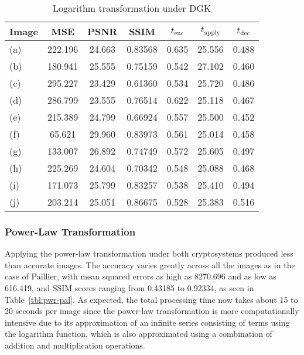 \begin{table}[h]
	\caption{Logarithm transformation under DGK}
	\label{tbl:log-dgk}
    \begin{tabular}{lcccccc}
        \toprule
        Image & MSE  & PSNR & SSIM & $t_\text{enc}$ & $t_\text{apply}$ & $t_\text{dec}$ \\ \midrule
		(a) & 222.196 & 24.663 & 0.83568 & 0.635 & 25.556 & 0.488 \\
		(b) & 180.941 & 25.555 & 0.75159 & 0.542 & 27.102 & 0.460 \\
		(c) & 295.227 & 23.429 & 0.61360 & 0.534 & 25.720 & 0.486 \\
		(d) & 286.799 & 23.555 & 0.76514 & 0.622 & 25.118 & 0.467 \\
		(e) & 215.389 & 24.799 & 0.66924 & 0.557 & 25.500 & 0.452 \\
		(f) & 65.621 & 29.960 & 0.83973 & 0.561 & 25.014 & 0.458 \\
		(g) & 133.007 & 26.892 & 0.74749 & 0.572 & 25.605 & 0.497 \\
		(h) & 225.269 & 24.604 & 0.70342 & 0.548 & 25.088 & 0.468 \\
		(i) & 171.073 & 25.799 & 0.83257 & 0.538 & 25.410 & 0.494 \\
		(j) & 203.214 & 25.051 & 0.86675 & 0.528 & 25.383 & 0.516 \\
		\bottomrule
    \end{tabular}
\end{table}

\subsubsection{Power-Law Transformation}
Applying the power-law transformation under both cryptosystems produced less than accurate images. The accuracy varies greatly across all the images as in the case of Paillier, with mean squared errors as high as 8270.696 and as low as 616.419, and SSIM scores ranging from 0.43185 to 0.92334, as seen in Table~\ref{tbl:pwr-pal}. As expected, the total processing time now takes about 15 to 20 seconds per image since the power-law transformation is more computationally intensive due to its approximation of an infinite series consisting of terms using the logarithm function, which is also approximated using a combination of addition and multiplication operations.


